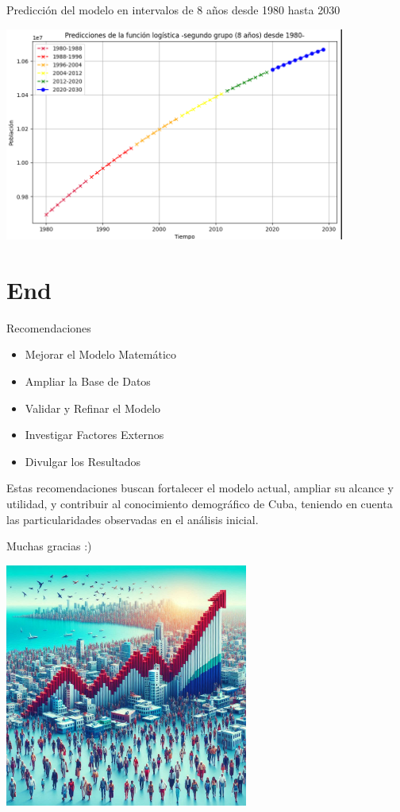 \documentclass{beamer}
\begin{document}
\begin{frame}{Predicción del modelo en intervalos de 8 años desde 1980 hasta 2030}
    \begin{center}
        \includegraphics[height = 7cm]{img/prediccion.png}
    \end{center}
\end{frame}

\section{End}
\begin{frame}{Recomendaciones}
\begin{itemize}
    \item Mejorar el Modelo Matemático
    \item Ampliar la Base de Datos
    \item Validar y Refinar el Modelo
    \item Investigar Factores Externos
    \item Divulgar los Resultados
    \end{itemize}
    Estas recomendaciones buscan fortalecer el modelo actual, ampliar su alcance y utilidad, y contribuir al conocimiento demográfico de Cuba, teniendo en cuenta las particularidades observadas en el análisis inicial.
\end{frame}

\begin{frame}{Muchas gracias :)}
    \begin{center}
    \includegraphics[height = 8cm]{img/cuba1.jpeg}
    \end{center}
\end{frame}
\end{document}

